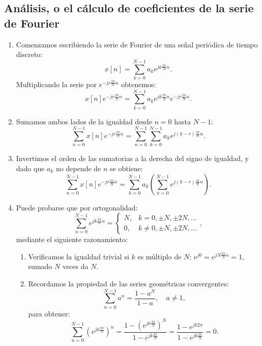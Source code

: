 \subsection{Análisis, o el cálculo de coeficientes de la serie de Fourier}

\begin{enumerate}
	\item Comenzamos escribiendo la serie de Fourier de una señal periódica de tiempo discreto:
	\begin{equation}
		x[n] = \sum_{k=0}^{N-1} a_{k} e^{jk\frac{2\pi}{N}n}.
	\end{equation}
	Multiplicando la serie por $e^{-jr\frac{2\pi}{N}n}$ obtenemos:
	\begin{equation}
		x[n] e^{-jr\frac{2\pi}{N}n} = \sum_{k=0}^{N-1} a_{k} e^{jk\frac{2\pi}{N}n} e^{-jr\frac{2\pi}{N}n}.
	\end{equation}
	
	\item Sumamos ambos lados de la igualdad desde $n=0$ hasta $N-1$:
	\begin{equation}
		\sum_{n=0}^{N-1} x[n] e^{-jr\frac{2\pi}{N}n} = \sum_{n=0}^{N-1} \sum_{k=0}^{N-1} a_{k} e^{j(k-r)\frac{2\pi}{N}n}.
	\end{equation}
	
	\item Invertimos el orden de las sumatorias a la derecha del signo de igualdad, y dado que $a_{k}$ no depende de $n$ se obtiene:
	\begin{equation}
		\sum_{n=0}^{N-1} x[n] e^{-jr\frac{2\pi}{N}n} = \sum_{k=0}^{N-1} a_{k} \left( \sum_{n=0}^{N-1} e^{j(k-r)\frac{2\pi}{N}n} \right).
	\end{equation}
	
	\item Puede probarse que por ortogonalidad:
	\begin{equation}
		\sum_{n=0}^{N-1} e^{jk\frac{2\pi}{N}n} =
		\begin{cases} 
			N, & k=0, \pm N, \pm 2N, \dots \\ 
			0, & k \neq 0, \pm N, \pm 2N, \dots
		\end{cases},
	\end{equation}
	mediante el siguiente razonamiento:
	\begin{enumerate}
		\item Verificamos la igualdad trivial si $k$ es múltiplo de $N$: $e^{j0} = e^{jN\frac{2\pi}{N}n} = 1$, sumado $N$ veces da $N$.
		\item Recordamos la propiedad de las series geométricas convergentes:
		\begin{equation}
			\sum_{n=0}^{N-1} a^n = \frac{1-a^{N}}{1-a}, \quad a \neq 1,
		\end{equation}
		para obtener:
		\begin{equation}
			\sum_{n=0}^{N-1} \left( e^{jk\frac{2\pi}{N}} \right)^n = \frac{1-\left(e^{jk\frac{2\pi}{N}}\right)^N}{1-e^{jk\frac{2\pi}{N}}} = \frac{1-e^{jk2\pi}}{1-e^{jk\frac{2\pi}{N}}} = 0.
		\end{equation}
	\end{enumerate}
	

\end{enumerate}
